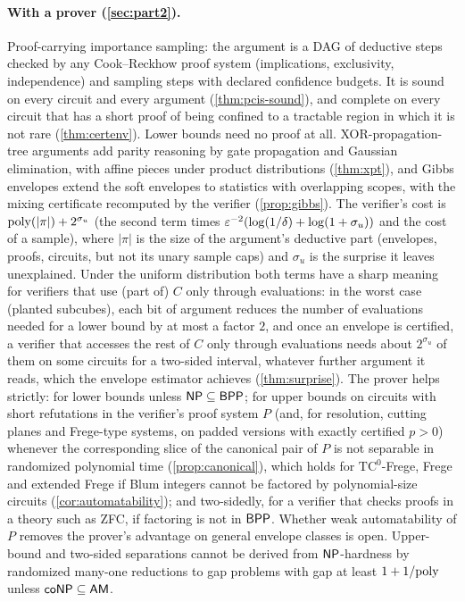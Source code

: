 \paragraph{With a prover (\cref{sec:part2}).} Proof-carrying importance sampling:
the argument is a DAG of deductive steps checked by any Cook--Reckhow proof
system (implications, exclusivity, independence) and sampling steps with
declared confidence budgets. It is sound on every circuit and every argument
(\cref{thm:pcis-sound}), and complete on every circuit that has a short proof of
being confined to a tractable region in which it is not rare
(\cref{thm:certenv}). Lower bounds need no proof at all. XOR-propagation-tree
arguments add parity reasoning by gate propagation and Gaussian elimination, with
affine pieces under product distributions (\cref{thm:xpt}), and Gibbs envelopes extend
the soft envelopes to statistics with overlapping scopes, with the mixing certificate
recomputed by the verifier (\cref{prop:gibbs}). The verifier's cost is
$\mathrm{poly}(|\pi|)+2^{\sigma_u}$ (the second term times
$\varepsilon^{-2}(\log(1/\delta)+\log(1+\sigma_u))$ and the cost of a sample), where $|\pi|$
is the size of the argument's deductive part (envelopes, proofs, circuits, but not its
unary sample caps) and $\sigma_u$ is the surprise it leaves unexplained. Under the
uniform distribution both terms have a sharp meaning for verifiers that use (part of)
$C$ only through evaluations: in the worst case (planted subcubes), each bit of argument
reduces the number of evaluations needed for a lower bound by at most a factor $2$, and
once an envelope is certified, a verifier that accesses the rest of $C$ only through evaluations needs
about $2^{\sigma_u}$ of them on some circuits for a two-sided interval, whatever
further argument it reads, which the envelope estimator achieves
(\cref{thm:surprise}). The prover helps strictly: for lower
bounds unless $\mathsf{NP}\subseteq\mathsf{BPP}$; for upper bounds on circuits with short
refutations in the verifier's proof system $P$ (and, for resolution, cutting planes and
Frege-type systems, on padded versions with exactly certified $p>0$) whenever the
corresponding slice of the canonical pair of $P$ is not
separable in randomized polynomial time (\cref{prop:canonical}), which holds for
$\mathrm{TC}^0$-Frege, Frege and extended Frege if Blum integers cannot be factored by
polynomial-size circuits (\cref{cor:automatability}); and two-sidedly, for a verifier
that checks proofs in a theory such as ZFC, if factoring is not in $\mathsf{BPP}$. Whether
weak automatability of $P$ removes the prover's advantage on general envelope classes
is open. Upper-bound and two-sided separations cannot be derived from $\mathsf{NP}$-hardness by
randomized many-one reductions to gap problems with gap at least $1+1/\mathrm{poly}$ unless
$\mathsf{coNP}\subseteq\mathsf{AM}$.

